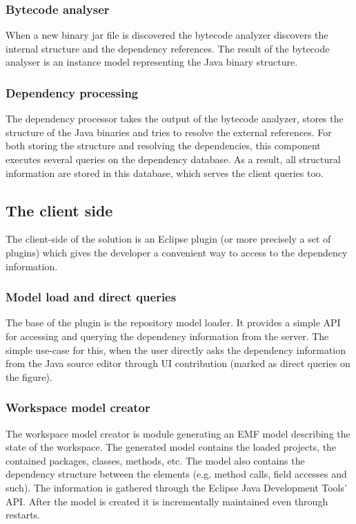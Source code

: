 \subsubsection{Bytecode analyser}
When a new binary jar file is discovered the bytecode analyzer  discovers the
internal structure and the dependency references. The result of the bytecode
analyser is an instance model representing the Java binary structure.

\subsubsection{Dependency processing}
The dependency processor takes the output of the bytecode analyzer, stores the 
structure of the Java binaries and tries to resolve the external references.
For both storing the structure and resolving the dependencies, this component
executes several queries on the dependency database. As a result, all structural
information are stored in this database, which serves the client queries too.


\subsection{The client side}
The client-side of the solution is an Eclipse plugin (or more precisely a set of
plugins) which gives the developer a convenient way to access to the dependency
information.

\subsubsection{Model load and direct queries}
The base of the plugin is the repository model loader. It provides a simple API
for accessing and querying the dependency information from the server. The
simple use-case for this, when the user directly asks the dependency information
from the Java source editor through UI contribution (marked as direct queries on
the figure).

\subsubsection{Workspace model creator}
The workspace model creator is module generating an EMF model describing the
state of the workspace. The generated model contains the loaded projects, the
contained packages, classes, methods, etc. The model also contains the
dependency structure between the elements (e.g. method calls, field accesses and
such). The information is gathered through the Eclipse Java Development Tools'
API. After the model is created it is incrementally maintained even through 
restarts.

